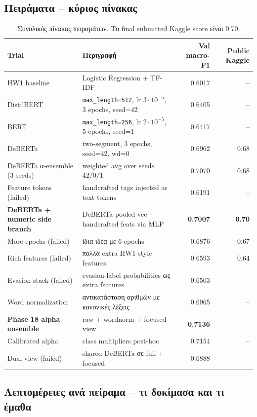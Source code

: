 \documentclass[12pt]{fphw}
\begin{document}
\subsection{Πειράματα -- κύριος πίνακας}

\begin{table}[H]
\centering
\small
\begin{tabularx}{\textwidth}{lXrr}
\toprule
Trial & Περιγραφή & Val macro-F1 & Public Kaggle \\
\midrule
HW1 baseline & Logistic Regression + TF-IDF & 0.6017 & -- \\
DistilBERT & \texttt{max\_length=512}, lr $3 \cdot 10^{-5}$, 3 epochs, seed=42 & 0.6405 & -- \\
BERT & \texttt{max\_length=256}, lr $2 \cdot 10^{-5}$, 5 epochs, seed=1 & 0.6417 & -- \\
DeBERTa & two-segment, 3 epochs, seed=42, wd=0 & 0.6962 & ~0.68 \\
DeBERTa α-ensemble (3 seeds) & weighted avg over seeds 42/0/1 & 0.7070 & 0.68 \\
Feature tokens (failed) & handcrafted tags injected as text tokens & 0.6191 & -- \\
\textbf{DeBERTa + numeric side branch} & DeBERTa pooled vec + handcrafted feats via MLP & \textbf{0.7007} & \textbf{0.70} \\
More epochs (failed) & ίδια ιδέα με 6 epochs & 0.6876 & 0.67 \\
Rich features (failed) & πολλά extra HW1-style features & 0.6593 & 0.64 \\
Evasion stack (failed) & evasion-label probabilities ως extra features & 0.6503 & -- \\
Word normalization & αντικατάσταση αριθμών με κανονικές λέξεις & 0.6965 & -- \\
\textbf{Phase 18 alpha ensemble} & raw + wordnorm + focused view & \textbf{0.7136} & -- \\
Calibrated alpha & class multipliers post-hoc & 0.7154 & -- \\
Dual-view (failed) & shared DeBERTa σε full + focused & 0.6888 & -- \\
\bottomrule
\end{tabularx}
\caption{Συνολικός πίνακας πειραμάτων. Το final submitted Kaggle score είναι 0.70.}
\label{tab:trials}
\end{table}

\subsection{Λεπτομέρειες ανά πείραμα -- τι δοκίμασα και τι έμαθα}
\end{document}
